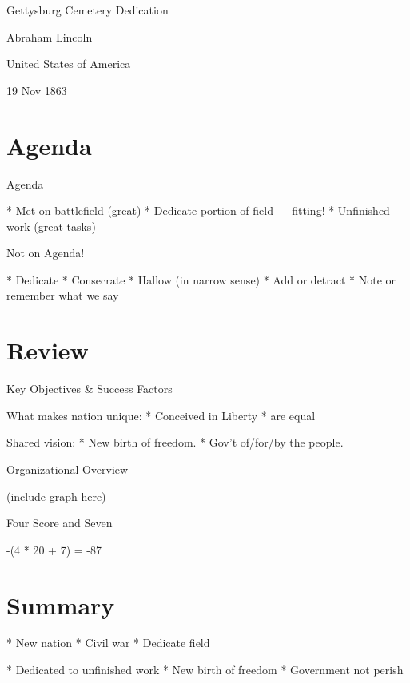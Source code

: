 \documentclass{beamer}
\begin{document}
Gettysburg Cemetery Dedication

Abraham Lincoln

United States of America

19 Nov 1863

\section{Agenda}

Agenda

  * Met on battlefield (great)
  * Dedicate portion of field --- fitting!
  * Unfinished work (great tasks)

Not on Agenda!

  * Dedicate
  * Consecrate
  * Hallow (in narrow sense)
  * Add or detract
  * Note or remember what we say

\section{Review}

Key Objectives \& Success Factors

What makes nation unique:
  * Conceived in Liberty
  * are equal

Shared vision:
  * New birth of freedom.
  * Gov't of/for/by the people.

Organizational Overview

(include graph here)

Four Score and Seven

-(4 * 20 + 7) = -87

\section{Summary}

* New nation
* Civil war
* Dedicate field

* Dedicated to unfinished work
* New birth of freedom
* Government not perish
\end{document}
